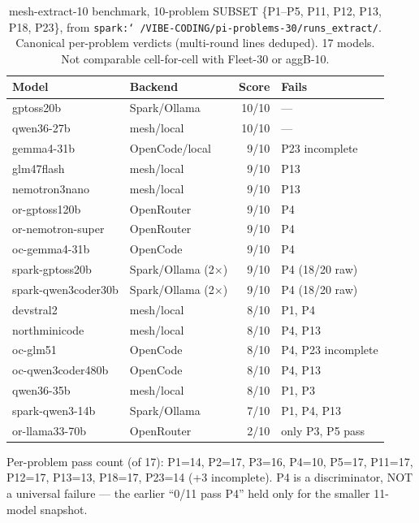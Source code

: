\begin{table}[t]
  \centering
  \caption{mesh-extract-10 benchmark, 10-problem SUBSET
    \{P1--P5, P11, P12, P13, P18, P23\}, from
    \texttt{spark:\char`~/VIBE-CODING/pi-problems-30/runs\_extract/}.
    Canonical per-problem verdicts (multi-round lines deduped). 17 models.
    Not comparable cell-for-cell with Fleet-30 or aggB-10.}
  \label{tab:mesh10}
  \begin{tabular}{llrl}
    \toprule
    Model & Backend & Score & Fails \\
    \midrule
    gptoss20b            & Spark/Ollama          & 10/10 & --- \\
    qwen36-27b           & mesh/local            & 10/10 & --- \\
    gemma4-31b           & OpenCode/local        & 9/10  & P23 incomplete \\
    glm47flash           & mesh/local            & 9/10  & P13 \\
    nemotron3nano        & mesh/local            & 9/10  & P13 \\
    or-gptoss120b        & OpenRouter            & 9/10  & P4 \\
    or-nemotron-super    & OpenRouter            & 9/10  & P4 \\
    oc-gemma4-31b        & OpenCode              & 9/10  & P4 \\
    spark-gptoss20b      & Spark/Ollama (2$\times$) & 9/10 & P4 (18/20 raw) \\
    spark-qwen3coder30b  & Spark/Ollama (2$\times$) & 9/10 & P4 (18/20 raw) \\
    devstral2            & mesh/local            & 8/10  & P1, P4 \\
    northminicode        & mesh/local            & 8/10  & P4, P13 \\
    oc-glm51             & OpenCode              & 8/10  & P4, P23 incomplete \\
    oc-qwen3coder480b    & OpenCode              & 8/10  & P4, P13 \\
    qwen36-35b           & mesh/local            & 8/10  & P1, P3 \\
    spark-qwen3-14b      & Spark/Ollama          & 7/10  & P1, P4, P13 \\
    or-llama33-70b       & OpenRouter            & 2/10  & only P3, P5 pass \\
    \bottomrule
  \end{tabular}

  \vspace{2pt}
  {\footnotesize
   Per-problem pass count (of 17): P1=14, P2=17, P3=16, P4=10, P5=17,
   P11=17, P12=17, P13=13, P18=17, P23=14 (+3 incomplete).
   P4 is a discriminator, NOT a universal failure --- the earlier
   ``0/11 pass P4'' held only for the smaller 11-model snapshot.}
\end{table}

